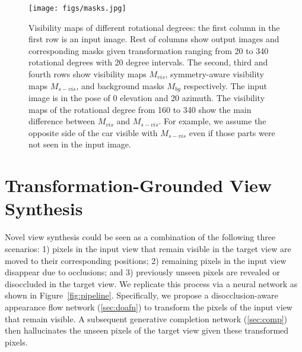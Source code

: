 \documentclass[10pt,twocolumn,letterpaper]{article}
\begin{document}
\begin{figure*}[t]
\begin{center}
\texttt{[image: figs/masks.jpg]}
\end{center}
\caption{Visibility maps of different rotational degrees: the first column in the first row is an input image. Rest of columns show output images and corresponding masks given transformation ranging from 20 to 340 rotational degrees with 20 degree intervals. The second, third and fourth rows show visibility maps $M_{vis}$, symmetry-aware visibility maps $M_{s-vis}$, and background masks $M_{bg}$ respectively. The input image is in the pose of 0 elevation and 20 azimuth. The visibility maps of the rotational degree from 160 to 340 show the main difference between $M_{vis}$ and $M_{s-vis}$. For example, we assume the opposite side of the car visible with $M_{s-vis}$ even if those parts were not seen in the input image.}
\label{fig:masks}
\vspace{-2mm}
\end{figure*}

\section{Transformation-Grounded View Synthesis}
Novel view synthesis could be seen as a combination of the following three scenarios: 1) pixels in the input view that remain visible in the target view are moved to their corresponding positions; 2) remaining pixels in the input view disappear due to occlusions; and 3) previously unseen pixels are revealed or disoccluded in the target view. We replicate this process via a neural network as shown in Figure~\ref{fig:pipeline}. Specifically, we propose a disocclusion-aware appearance flow network (\ref{sec:doafn}) to transform the pixels of the input view that remain visible. A subsequent generative completion network (\ref{sec:comp}) then hallucinates the unseen pixels of the target view given these transformed pixels.
\end{document}
